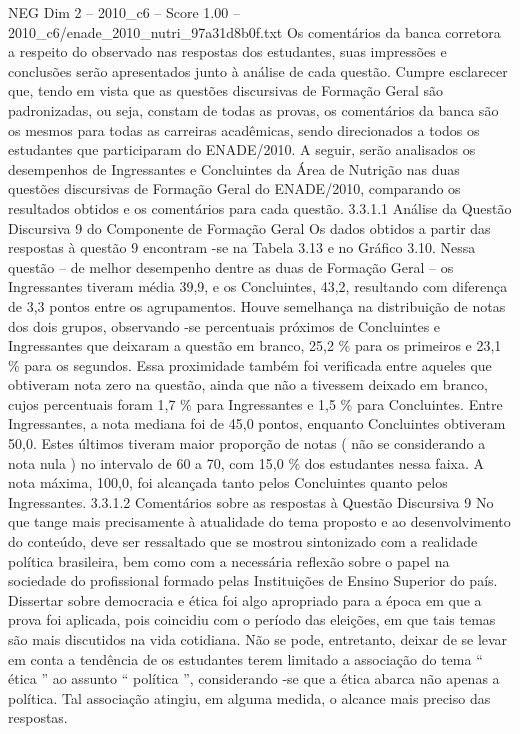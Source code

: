 \begin{textsample}{NEG Dim 2 – 2010\_c6 – Score 1.00 – 2010\_c6/enade\_2010\_nutri\_97a31d8b0f.txt}
Os comentários da banca corretora a respeito do observado nas respostas dos estudantes, suas impressões e conclusões serão apresentados junto à análise de cada questão.
Cumpre esclarecer que, tendo em vista que as questões discursivas de Formação Geral são padronizadas, ou seja, constam de todas as provas, os comentários da banca são os mesmos para todas as carreiras acadêmicas, sendo direcionados a todos os estudantes que participaram do ENADE/2010.
A seguir, serão analisados os desempenhos de Ingressantes e Concluintes da Área de Nutrição nas duas questões discursivas de Formação Geral do ENADE/2010, comparando os resultados obtidos e os comentários para cada questão. 3.3.1.1 Análise da Questão Discursiva 9 do Componente de Formação Geral Os dados obtidos a partir das respostas à questão 9 encontram -se na Tabela 3.13 e no Gráfico 3.10.
Nessa questão – de melhor desempenho dentre as duas de Formação Geral – os Ingressantes tiveram média 39,9, e os Concluintes, 43,2, resultando com diferença de 3,3 pontos entre os agrupamentos.
Houve semelhança na distribuição de notas dos dois grupos, observando -se percentuais próximos de Concluintes e Ingressantes que deixaram a questão em branco, 25,2 \% para os primeiros e 23,1 \% para os segundos.
Essa proximidade também foi verificada entre aqueles que obtiveram nota zero na questão, ainda que não a tivessem deixado em branco, cujos percentuais foram 1,7 \% para Ingressantes e 1,5 \% para Concluintes.
Entre Ingressantes, a nota mediana foi de 45,0 pontos, enquanto Concluintes obtiveram 50,0.
Estes últimos tiveram maior proporção de notas ( não se considerando a nota nula ) no intervalo de 60 a 70, com 15,0 \% dos estudantes nessa faixa.
A nota máxima, 100,0, foi alcançada tanto pelos Concluintes quanto pelos Ingressantes. 3.3.1.2 Comentários sobre as respostas à Questão Discursiva 9 No que tange mais precisamente à atualidade do tema proposto e ao desenvolvimento do conteúdo, deve ser ressaltado que se mostrou sintonizado com a realidade política brasileira, bem como com a necessária reflexão sobre o papel na sociedade do profissional formado pelas Instituições de Ensino Superior do país.
Dissertar sobre democracia e ética foi algo apropriado para a época em que a prova foi aplicada, pois coincidiu com o período das eleições, em que tais temas são mais discutidos na vida cotidiana.
Não se pode, entretanto, deixar de se levar em conta a tendência de os estudantes terem limitado a associação do tema “ ética ” ao assunto “ política ”, considerando -se que a ética abarca não apenas a política.
Tal associação atingiu, em alguma medida, o alcance mais preciso das respostas.

\end{textsample}
